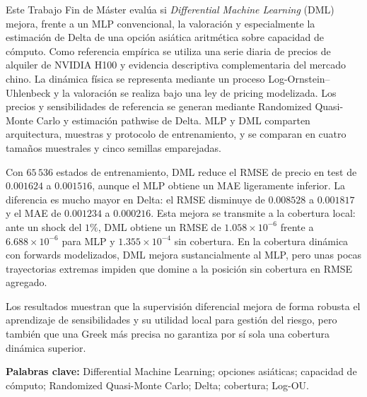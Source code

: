 Este Trabajo Fin de Máster evalúa si 
\textit{Differential Machine Learning} (DML) mejora, frente a un MLP convencional, la valoración y especialmente la estimación de Delta de una opción asiática aritmética sobre capacidad de cómputo. Como referencia empírica se utiliza una serie diaria de precios de alquiler de NVIDIA H100 y evidencia descriptiva complementaria del mercado chino. La dinámica física se representa mediante un proceso Log-Ornstein--Uhlenbeck y la valoración se realiza bajo una ley de pricing modelizada. Los precios y sensibilidades de referencia se generan mediante Randomized Quasi-Monte Carlo y estimación pathwise de Delta. MLP y DML comparten arquitectura, muestras y protocolo de entrenamiento, y se comparan en cuatro tamaños muestrales y cinco semillas emparejadas.

Con $65\,536$ estados de entrenamiento, DML reduce el RMSE de precio en test de $0.001624$ a $0.001516$, aunque el MLP obtiene un MAE ligeramente inferior. La diferencia es mucho mayor en Delta: el RMSE disminuye de $0.008528$ a $0.001817$ y el MAE de $0.001234$ a $0.000216$. Esta mejora se transmite a la cobertura local: ante un shock del $1\%$, DML obtiene un RMSE de $1.058\times10^{-6}$ frente a $6.688\times10^{-6}$ para MLP y $1.355\times10^{-4}$ sin cobertura. En la cobertura dinámica con forwards modelizados, DML mejora sustancialmente al MLP, pero unas pocas trayectorias extremas impiden que domine a la posición sin cobertura en RMSE agregado.

Los resultados muestran que la supervisión diferencial mejora de forma robusta el aprendizaje de sensibilidades y su utilidad local para gestión del riesgo, pero también que una Greek más precisa no garantiza por sí sola una cobertura dinámica superior.

\vspace{0.5em}
\noindent\textbf{Palabras clave:} Differential Machine Learning; opciones asiáticas; capacidad de cómputo; Randomized Quasi-Monte Carlo; Delta; cobertura; Log-OU.
